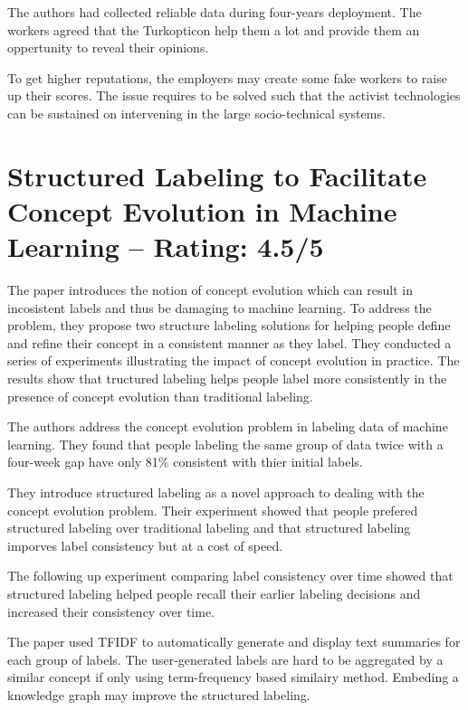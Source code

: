 \documentclass[a4paper]{article}
\begin{document}
The authors had collected reliable data during four-years deployment. The workers agreed that the Turkopticon help them a lot and provide them an oppertunity to reveal their opinions.

To get higher reputations, the employers may create some fake workers to raise up their scores. The issue requires to be solved such that the activist technologies can be sustained on intervening in the large socio-technical systems.


\section{Structured Labeling to Facilitate Concept Evolution in Machine Learning -- Rating: 4.5/5}
The paper \cite{Kulesza2014} introduces the notion of concept evolution which can result in incosistent labels and thus be damaging to machine learning. To address the problem, they propose two structure labeling solutions for helping people define and refine their concept in a consistent manner as they label. They conducted a series of experiments illustrating the impact of concept evolution in practice. The results show that tructured labeling helps people label more consistently in the presence of concept evolution than traditional labeling.

The authors address the concept evolution problem in labeling data of machine learning. They found that people labeling the same group of data twice with a four-week gap have only 81\% consistent with thier initial labels.

They introduce structured labeling as a novel approach to dealing with the concept evolution problem. Their experiment showed that people prefered structured labeling over traditional labeling and that structured labeling imporves label consistency but at a cost of speed.

The following up experiment comparing label consistency over time showed that structured labeling helped people recall their earlier labeling decisions and increased their consistency over time.

The paper used TFIDF to automatically generate and display text summaries for each group of labels. The user-generated labels are hard to be aggregated by a similar concept if only using term-frequency based similairy method. Embeding a knowledge graph may improve the structured labeling.
\end{document}
